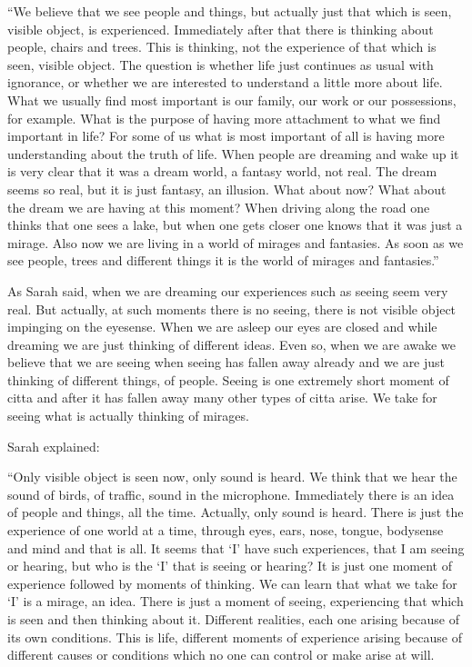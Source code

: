 ``We believe that we see people and things, but actually just that which
is seen, visible object, is experienced. Immediately after that there is
thinking about people, chairs and trees. This is thinking, not the
experience of that which is seen, visible object. The question is
whether life just continues as usual with ignorance, or whether we are
interested to understand a little more about life. What we usually find
most important is our family, our work or our possessions, for example.
What is the purpose of having more attachment to what we find important
in life? For some of us what is most important of all is having more
understanding about the truth of life. When people are dreaming and wake
up it is very clear that it was a dream world, a fantasy world, not
real. The dream seems so real, but it is just fantasy, an illusion. What
about now? What about the dream we are having at this moment? When
driving along the road one thinks that one sees a lake, but when one
gets closer one knows that it was just a mirage. Also now we are living
in a world of mirages and fantasies. As soon as we see people, trees and
different things it is the world of mirages and fantasies.''

As Sarah said, when we are dreaming our experiences such as seeing seem
very real. But actually, at such moments there is no seeing, there is
not visible object impinging on the eyesense. When we are asleep our
eyes are closed and while dreaming we are just thinking of different
ideas. Even so, when we are awake we believe that we are seeing when
seeing has fallen away already and we are just thinking of different
things, of people. Seeing is one extremely short moment of citta and
after it has fallen away many other types of citta arise. We take for
seeing what is actually thinking of mirages.

Sarah explained:

``Only visible object is seen now, only sound is heard. We think that we
hear the sound of birds, of traffic, sound in the microphone.
Immediately there is an idea of people and things, all the time.
Actually, only sound is heard. There is just the experience of one world
at a time, through eyes, ears, nose, tongue, bodysense and mind and that
is all. It seems that `I' have such experiences, that I am seeing or
hearing, but who is the `I' that is seeing or hearing? It is just one
moment of experience followed by moments of thinking. We can learn that
what we take for `I' is a mirage, an idea. There is just a moment of
seeing, experiencing that which is seen and then thinking about it.
Different realities, each one arising because of its own conditions.
This is life, different moments of experience arising because of
different causes or conditions which no one can control or make arise at
will.

